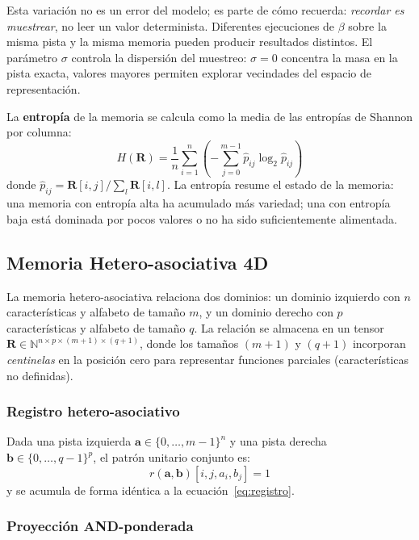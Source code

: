 Esta variación no es un error del modelo; es parte de cómo recuerda:
\emph{recordar es muestrear}, no leer un valor determinista.
Diferentes ejecuciones de $\beta$ sobre la misma pista y la misma memoria pueden producir
resultados distintos.
El parámetro $\sigma$ controla la dispersión del muestreo: $\sigma = 0$ concentra la
masa en la pista exacta, valores mayores permiten explorar vecindades del espacio de
representación.

La \textbf{entropía} de la memoria se calcula como la media de las entropías de Shannon
por columna:
\begin{equation}
    H(\mathbf{R}) = \frac{1}{n} \sum_{i=1}^{n} \left(-\sum_{j=0}^{m-1} \hat{p}_{ij} \log_2 \hat{p}_{ij}\right)
    \label{eq:entropia}
\end{equation}
donde $\hat{p}_{ij} = \mathbf{R}[i,j] / \sum_l \mathbf{R}[i,l]$.
La entropía resume el estado de la memoria: una memoria con entropía alta ha
acumulado más variedad; una con entropía baja está dominada por pocos valores
o no ha sido suficientemente alimentada.

\subsection{Memoria Hetero-asociativa 4D}
\label{sec:hetero4d}

La memoria hetero-asociativa \cite{pineda2024hetero} relaciona dos dominios:
un dominio izquierdo con $n$ características y alfabeto de tamaño $m$, y un dominio
derecho con $p$ características y alfabeto de tamaño $q$.
La relación se almacena en un tensor
$\mathbf{R} \in \mathbb{N}^{n \times p \times (m+1) \times (q+1)}$,
donde los tamaños $(m+1)$ y $(q+1)$ incorporan \emph{centinelas} en la posición cero
para representar funciones parciales (características no definidas).

\subsubsection*{Registro hetero-asociativo}

Dada una pista izquierda $\mathbf{a} \in \{0,\ldots,m-1\}^n$ y una pista derecha
$\mathbf{b} \in \{0,\ldots,q-1\}^p$, el patrón unitario conjunto es:
\begin{equation}
    r(\mathbf{a}, \mathbf{b})[i, j, a_i, b_j] = 1
    \label{eq:registro-hetero}
\end{equation}
y se acumula de forma idéntica a la ecuación~\eqref{eq:registro}.

\subsubsection*{Proyección AND-ponderada}

